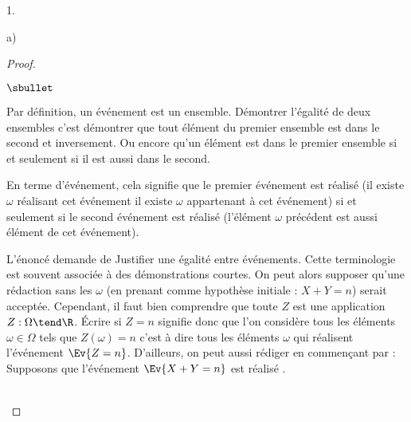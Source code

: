 \documentclass[11pt]{article}%
\begin{document}
\begin{noliste}{1.}
\begin{noliste}{a)}
\begin{proof}


      \begin{remarkL}{1}%
        \begin{noliste}{$\sbullet$}
        \item Par définition, un événement est un
          ensemble. Démontrer l'égalité de deux ensembles c'est
          démontrer que tout élément du premier ensemble est dans le
          second et inversement. Ou encore qu'un élément est dans le
          premier ensemble si et seulement si il est aussi dans le
          second.
        \item En terme d'événement, cela signifie que le premier
          événement est réalisé (il existe $\omega$ réalisant cet
          événement \ie il existe $\omega$ appartenant à cet
          événement) si et seulement si le second événement est
          réalisé (l'élément $\omega$ précédent est aussi élément de
          cet événement).
        \item L'énoncé demande de \og Justifier \fg{} une égalité
          entre événements. Cette terminologie est souvent associée à
          des démonstrations courtes. On peut alors supposer qu'une
          rédaction sans les $\omega$ (en prenant comme hypothèse
          initiale : $X + Y = n$) serait acceptée. Cependant, il faut
          bien comprendre que toute \var $Z$ est une application $Z :
          \Omega \tend \R$. Écrire \og si $Z = n$ \fg{} signifie donc
          que l'on considère tous les éléments $\omega \in \Omega$
          tels que $Z(\omega) = n$ c'est à dire tous les éléments
          $\omega$ qui réalisent l'événement $\Ev{Z = n}$. D'ailleurs,
          on peut aussi rédiger en commençant par : \og Supposons que
          l'événement $\Ev{X + Y = n}$ est réalisé \fg{}.          
        \end{noliste}          
      \end{remarkL}~\\[-1.4cm]
    \end{proof}


\end{noliste}
\end{noliste}
\end{document}
